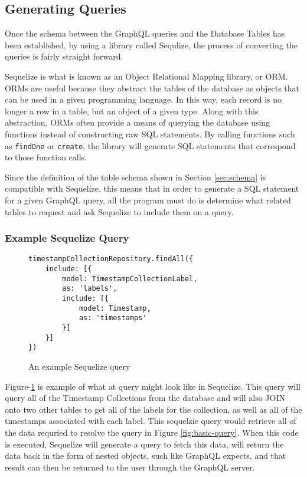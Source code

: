 \subsection{Generating Queries}

Once the schema between the GraphQL queries and the Database Tables has been established, by using a library called Sequlize, the process of converting the queries is fairly straight forward.

Sequelize is what is known as an Object Relational Mapping library, or ORM.  ORMs are useful because they abstract the tables of the database as objects that can be used in a given programming language.  In this way, each record is no longer a row in a table, but an object of a given type.  Along with this abstraction, ORMs often provide a means of querying the database using functions instead of constructing raw SQL statements.  By calling functions such as \Verb!findOne! or \Verb!create!, the library will generate SQL statements that correspond to those function calls.

Since the definition of the table schema shown in Section \ref{sec:schema} is compatible with Sequelize, this means that in order to generate a SQL statement for a given GraphQL query, all the program must do is determine what related tables to request and ask Sequelize to include them on a query.

\subsubsection{Example Sequelize Query}

\begin{figure}
    \begin{verbatim}
timestampCollectionRepository.findAll({
    include: [{
        model: TimestampCollectionLabel,
        as: 'labels',
        include: [{
            model: Timestamp,
            as: 'timestamps'
        }]
    }]
})
    \end{verbatim}
    \caption{An example Sequelize query}
    \label{fig:sequelize-query}
\end{figure}

Figure-\ref{fig:sequelize-query} is example of what at query might look like in Sequelize.  This query will query all of the Timestamp Collections from the database and will also JOIN onto two other tables to get all of the labels for the collection, as well as all of the timestamps associated with each label.  This sequelzie query would retrieve all of the data requried to resolve the query in Figure \ref{fig:basic-query}.  When this code is executed, Sequelize will generate a query to fetch this data, will return the data back in the form of nested objects, such like GraphQL expects, and that result can then be returned to the user through the GraphQL server.

